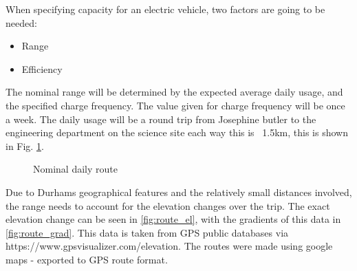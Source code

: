 \documentclass{article}
\begin{document}
When specifying capacity for an electric vehicle, two factors are going to be needed:
\begin{itemize}
    \item Range
    \item Efficiency
\end{itemize}
The nominal range will be determined by the expected average daily usage, and the specified charge frequency. 
The value given for charge frequency will be once a week.
The daily usage will be a round trip from Josephine butler to the engineering department on the science site each way this is ~1.5km, this is shown in Fig. \ref{fig:route}.
\begin{figure}[H]
    \centering
    \caption{Nominal daily route}
    \label{fig:route}
\end{figure}
Due to Durhams geographical features and the relatively small distances involved, the range needs to account for the elevation changes over the trip.
The exact elevation change can be seen in \ref{fig:route_el}, with the gradients of this data in \ref{fig:route_grad}.
This data is taken from GPS public databases via https://www.gpsvisualizer.com/elevation.
The routes were made using google maps - exported to GPS route format.
\end{document}
